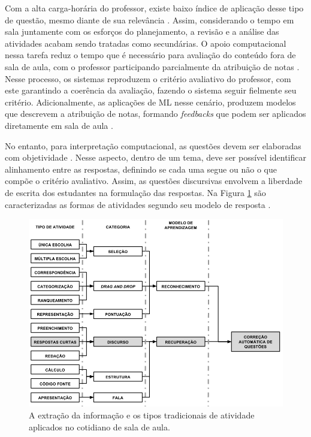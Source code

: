 Com a alta carga-horária do professor, existe baixo índice de aplicação desse tipo de questão, mesmo diante de sua relevância \cite{bilgin2017}. Assim, considerando o tempo em sala juntamente com os esforços do planejamento, a revisão e a análise das atividades acabam sendo tratadas como secundárias. O apoio computacional nessa tarefa reduz o tempo que é necessário para avaliação do conteúdo fora de sala de aula, com o professor participando parcialmente da atribuição de notas \cite{ming2005}. Nesse processo, os sistemas reproduzem o critério avaliativo do professor, com este garantindo a coerência da avaliação, fazendo o sistema seguir fielmente seu critério. Adicionalmente, as aplicações de ML nesse cenário, produzem modelos que descrevem a atribuição de notas, formando \textit{feedbacks} que podem ser aplicados diretamente em sala de aula \cite{butcher2010, bernius2022}. 

No entanto, para interpretação computacional, as questões devem ser elaboradas com objetividade \cite{bailey2008}. Nesse aspecto, dentro de um tema, deve ser possível identificar alinhamento entre as respostas, definindo se cada uma segue ou não o que compõe o critério avaliativo. Assim, as questões discursivas \cite{bezerra2008} envolvem a liberdade de escrita dos estudantes na formulação das respostas. Na Figura \ref{fig-atividades} são caracterizadas as formas de atividades segundo seu modelo de resposta \cite{spalenza2017}.

\begin{figure}[!h]
\centering
\includegraphics[width=\textwidth]{figuras/tiposAtividade}
\caption{A extração da informação e os tipos tradicionais de atividade aplicados no cotidiano de sala de aula.}
\label{fig-atividades}
\end{figure}

